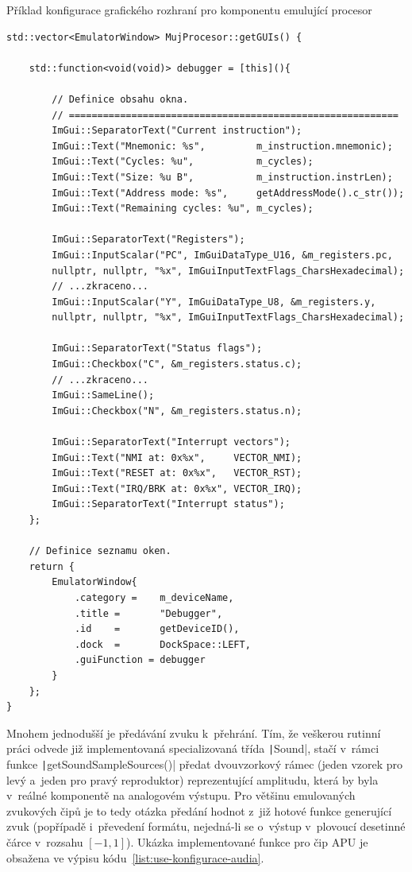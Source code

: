 \begin{listing}
	\caption{Příklad konfigurace grafického rozhraní pro komponentu emulující procesor}
	\label{list:use-konfigurace-gui}
	\begin{verbatim}
std::vector<EmulatorWindow> MujProcesor::getGUIs() {
	
	std::function<void(void)> debugger = [this](){
		
		// Definice obsahu okna.
		// ==========================================================
		ImGui::SeparatorText("Current instruction");
		ImGui::Text("Mnemonic: %s",         m_instruction.mnemonic);
		ImGui::Text("Cycles: %u",           m_cycles);
		ImGui::Text("Size: %u B",           m_instruction.instrLen);
		ImGui::Text("Address mode: %s",     getAddressMode().c_str());
		ImGui::Text("Remaining cycles: %u", m_cycles);
		
		ImGui::SeparatorText("Registers");
		ImGui::InputScalar("PC", ImGuiDataType_U16, &m_registers.pc,
		nullptr, nullptr, "%x", ImGuiInputTextFlags_CharsHexadecimal);
		// ...zkraceno...
		ImGui::InputScalar("Y", ImGuiDataType_U8, &m_registers.y,
		nullptr, nullptr, "%x", ImGuiInputTextFlags_CharsHexadecimal);
		
		ImGui::SeparatorText("Status flags");
		ImGui::Checkbox("C", &m_registers.status.c);
		// ...zkraceno...
		ImGui::SameLine();
		ImGui::Checkbox("N", &m_registers.status.n);
		
		ImGui::SeparatorText("Interrupt vectors");
		ImGui::Text("NMI at: 0x%x",     VECTOR_NMI);
		ImGui::Text("RESET at: 0x%x",   VECTOR_RST);
		ImGui::Text("IRQ/BRK at: 0x%x", VECTOR_IRQ);
		ImGui::SeparatorText("Interrupt status");
	};
	
	// Definice seznamu oken.
	return {
		EmulatorWindow{
			.category =    m_deviceName,
			.title =       "Debugger",
			.id    =       getDeviceID(),
			.dock  =       DockSpace::LEFT,
			.guiFunction = debugger
		}
	};
}
	\end{verbatim}
\end{listing}

Mnohem jednodušší je předávání zvuku k~přehrání. Tím, že veškerou rutinní práci odvede již implementovaná specializovaná třída \texttt|Sound|, stačí v~rámci funkce \texttt|getSoundSampleSources()| předat dvouvzorkový rámec (jeden vzorek pro levý a~jeden pro pravý reproduktor) reprezentující amplitudu, která by byla v~reálné komponentě na analogovém výstupu. Pro většinu emulovaných zvukových čipů je to tedy otázka předání hodnot z~již hotové funkce generující zvuk (popřípadě i~převedení formátu, nejedná-li se o~výstup v~plovoucí desetinné čárce v~rozsahu $[-1, 1]$). Ukázka implementované funkce pro čip APU je obsažena ve výpisu kódu~\ref{list:use-konfigurace-audia}.

